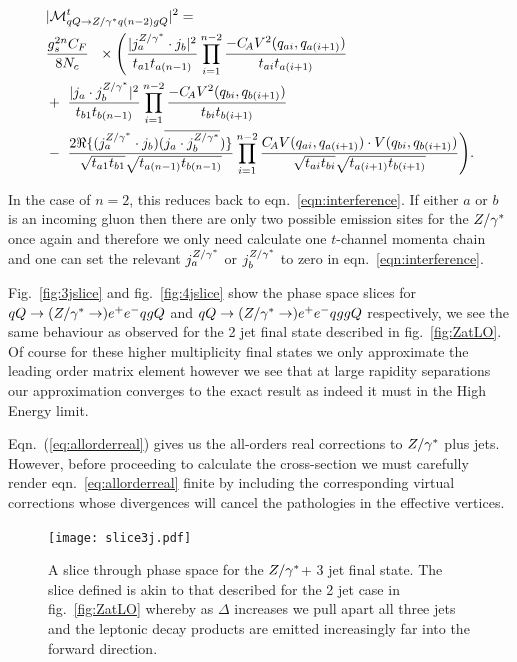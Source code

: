 		\begin{align}
		\begin{split}
		    &|\mathcal{M}^{t}_{qQ\to Z/\gamma^* q(n-2)gQ}|^2 = \\&\frac{g_s^{2n}C_F}{8N_c}\
		    \ \times \Bigg( \frac{| j_a^{Z/\gamma^*}\cdot j_b|^2}{t_{a1}t_{a(n-1)}} \prod^{n-2}_{i=1} \frac{-C_{\!A} V^2(q_{ai},
		      q_{a(i+1)})}{t_{ai} t_{a(i+1)}}  \\ & + \ \frac{|j_a \cdot j_b^{Z/\gamma^*} |^2}{t_{b1}t_{b(n-1)}}
		    \prod^{n-2}_{i=1}\frac{-C_{\!A} V^2(q_{bi}, q_{b(i+1)})}{t_{bi} t_{b(i+1)}}  \\
		    &-\ \frac{2\Re\{(j_a^{Z/\gamma^*}\cdot j_b)(\overline{j_a \cdot
		        j_b^{Z/\gamma^*}})\}}{\sqrt{t_{a1}t_{b1}}\sqrt{t_{a(n-1)} t_{b(n-1)}}}
		    \prod^{n-2}_{i=1}\frac{C_{\!A} V(q_{ai}, q_{a(i+1)})\cdot V(q_{bi},
		      q_{b(i+1)})}{\sqrt{t_{ai}t_{bi}} \sqrt{t_{a(i+1)}t_{b(i+1)}}}\Bigg).
			\label{eq:allorderreal}
		\end{split}
		\end{align}

		In the case of $n=2$, this reduces back to eqn.~\eqref{eqn:interference}.  If
		either $a$ or $b$ is an incoming gluon then there are only two possible emission sites
		for the $Z/\gamma^*$ once again and therefore we only need calculate one $t$-channel momenta chain
		and one can set the relevant $j_a^{Z/\gamma^*}$ or $j_b^{Z/\gamma^*}$ to
		zero in eqn.~\eqref{eqn:interference}.

		Fig.~\eqref{fig:3jslice} and fig.~\eqref{fig:4jslice} show the phase space
		slices for $qQ\to(Z/\gamma^*\to)e^+e^-qgQ$ and $qQ\to(Z/\gamma^*\to)e^+e^-qggQ$
		respectively, we see the same behaviour as observed for the 2 jet final state described in
		fig.~\eqref{fig:ZatLO}.  Of course for these higher multiplicity final states we only
		approximate the leading order matrix element however we see that at large rapidity separations
		our approximation converges to the exact result as indeed it must in the High Energy limit.

		Eqn.~(\eqref{eq:allorderreal}) gives us the all-orders real corrections to $Z/\gamma^*$ plus jets.
		However, before proceeding to calculate the cross-section we must carefully render eqn.~\eqref{eq:allorderreal}
		finite by including the corresponding virtual corrections whose divergences will cancel the pathologies
		in the effective vertices.

		\begin{figure}[hbt]
		  \begin{center}
		    \texttt{[image: slice3j.pdf]}
		    \caption{A slice through phase space for the $Z/\gamma^*$+ 3 jet final state.  The slice defined is
		    akin to that described for the 2 jet case in fig.~\eqref{fig:ZatLO} whereby as $\Delta$ increases
		    we pull apart all three jets and the leptonic decay products are emitted increasingly far into
		    the forward direction.}
		    \label{fig:3jslice}
		  \end{center}
		\end{figure}


